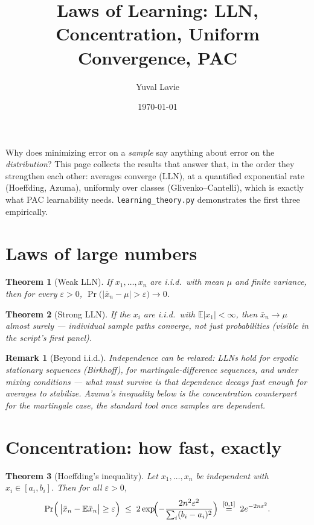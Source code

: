 \documentclass[11pt]{article}
\title{Laws of Learning: LLN, Concentration, Uniform Convergence, PAC}
\author{Yuval Lavie}
\date{\today}
\newtheorem{theorem}{Theorem}
\newtheorem{remark}{Remark}
\begin{document}
\maketitle

\noindent
Why does minimizing error on a \emph{sample} say anything about error on
the \emph{distribution}? This page collects the results that answer that,
in the order they strengthen each other: averages converge (LLN), at a
quantified exponential rate (Hoeffding, Azuma), uniformly over classes
(Glivenko--Cantelli), which is exactly what PAC learnability needs.
\texttt{learning\_theory.py} demonstrates the first three empirically.

\section{Laws of large numbers}

\begin{theorem}[Weak LLN]
If $x_1,\dots,x_n$ are i.i.d.\ with mean $\mu$ and finite variance, then
for every $\varepsilon > 0$,
$\Pr\bigl(|\bar x_n - \mu| > \varepsilon\bigr) \to 0$.
\end{theorem}

\begin{theorem}[Strong LLN]
If the $x_i$ are i.i.d.\ with $\mathbb{E}|x_1| < \infty$, then
$\bar x_n \to \mu$ \emph{almost surely} --- individual sample paths
converge, not just probabilities (visible in the script's first panel).
\end{theorem}

\begin{remark}[Beyond i.i.d.]
Independence can be relaxed: LLNs hold for ergodic stationary sequences
(Birkhoff), for martingale-difference sequences, and under mixing
conditions --- what must survive is that dependence decays fast enough for
averages to stabilize. Azuma's inequality below is the concentration
counterpart for the martingale case, the standard tool once samples are
dependent.
\end{remark}

\section{Concentration: how fast, exactly}

\begin{theorem}[Hoeffding's inequality]
Let $x_1,\dots,x_n$ be independent with $x_i \in [a_i,b_i]$. Then for all
$\varepsilon>0$,
\begin{equation}
  \Pr\Bigl(\,\bigl|\bar x_n - \mathbb{E}\bar x_n\bigr| \ge \varepsilon\Bigr)
  \;\le\;
  2\exp\!\Bigl(-\frac{2n^2\varepsilon^2}{\sum_i (b_i-a_i)^2}\Bigr)
  \;\overset{[0,1]}{=}\;
  2e^{-2n\varepsilon^2}.
  \label{eq:hoeffding}
\end{equation}
\end{theorem}
\end{document}
